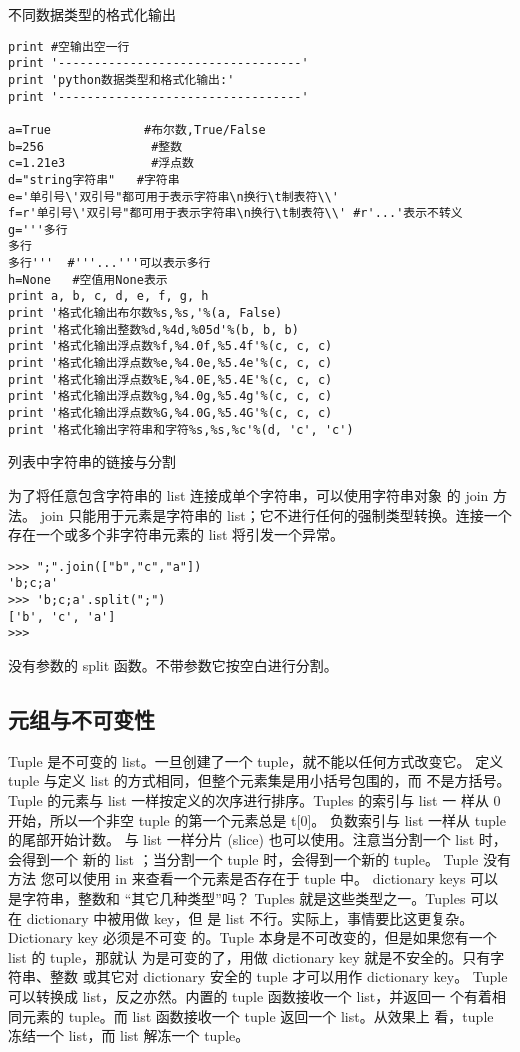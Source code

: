 \documentclass[twoside,11pt]{book}
\begin{document}
不同数据类型的格式化输出

\begin{lstlisting}
print #空输出空一行
print '----------------------------------'
print 'python数据类型和格式化输出:'
print '----------------------------------'

a=True             #布尔数,True/False
b=256               #整数
c=1.21e3            #浮点数
d="string字符串"   #字符串
e='单引号\'双引号"都可用于表示字符串\n换行\t制表符\\'
f=r'单引号\'双引号"都可用于表示字符串\n换行\t制表符\\' #r'...'表示不转义
g='''多行
多行
多行'''  #'''...'''可以表示多行
h=None   #空值用None表示
print a, b, c, d, e, f, g, h
print '格式化输出布尔数%s,%s,'%(a, False)
print '格式化输出整数%d,%4d,%05d'%(b, b, b)
print '格式化输出浮点数%f,%4.0f,%5.4f'%(c, c, c)
print '格式化输出浮点数%e,%4.0e,%5.4e'%(c, c, c)
print '格式化输出浮点数%E,%4.0E,%5.4E'%(c, c, c)
print '格式化输出浮点数%g,%4.0g,%5.4g'%(c, c, c)
print '格式化输出浮点数%G,%4.0G,%5.4G'%(c, c, c)
print '格式化输出字符串和字符%s,%s,%c'%(d, 'c', 'c')
\end{lstlisting}

列表中字符串的链接与分割

为了将任意包含字符串的 list 连接成单个字符串，可以使用字符串对象 的 join 方法。
join 只能用于元素是字符串的 list；它不进行任何的强制类型转换。连接一个 存在一个或多个非字符串元素的 list 将引发一个异常。
\begin{lstlisting}
>>> ";".join(["b","c","a"])
'b;c;a'
>>> 'b;c;a'.split(";")
['b', 'c', 'a']
>>>
\end{lstlisting}

没有参数的 split 函数。不带参数它按空白进行分割。

\subsection{元组与不可变性}

Tuple 是不可变的 list。一旦创建了一个 tuple，就不能以任何方式改变它。
定义 tuple 与定义 list 的方式相同，但整个元素集是用小括号包围的，而 不是方括号。
Tuple 的元素与 list 一样按定义的次序进行排序。Tuples 的索引与 list 一 样从 0 开始，所以一个非空 tuple 的第一个元素总是 t[0]。
负数索引与 list 一样从 tuple 的尾部开始计数。
与 list 一样分片 (slice) 也可以使用。注意当分割一个 list 时，会得到一个 新的 list ；当分割一个 tuple 时，会得到一个新的 tuple。
Tuple 没有方法
您可以使用 in 来查看一个元素是否存在于 tuple 中。
dictionary keys 可以是字符串，整数和 “其它几种类型”吗？ Tuples 就是这些类型之一。Tuples 可以在 dictionary 中被用做 key，但 是 list 不行。实际上，事情要比这更复杂。Dictionary key 必须是不可变 的。Tuple 本身是不可改变的，但是如果您有一个 list 的 tuple，那就认 为是可变的了，用做 dictionary key 就是不安全的。只有字符串、整数 或其它对 dictionary 安全的 tuple 才可以用作 dictionary key。
Tuple 可以转换成 list，反之亦然。内置的 tuple 函数接收一个 list，并返回一
个有着相同元素的 tuple。而 list 函数接收一个 tuple 返回一个 list。从效果上
看，tuple 冻结一个 list，而 list 解冻一个 tuple。
\end{document}
